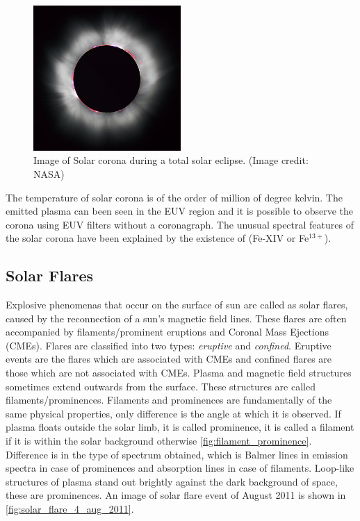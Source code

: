 \begin{figure}[h!]
    \centering
    \includegraphics[width=0.5\textwidth]{images/corona.jpg}
    \caption[Image of Solar corona during a total solar eclipse]{Image of Solar corona during a total solar eclipse. (Image credit: NASA)}
    \label{fig:corona_eclipse}
\end{figure}

The temperature of solar corona is of the order of million of degree kelvin. The emitted plasma can been seen in the EUV region and it is possible to observe the corona using EUV filters without a coronagraph. The unusual spectral features of the solar corona have been explained by the existence of (Fe-XIV or Fe$^{13+}$). \citep{aschwanden2006physics}

\subsection{Solar Flares}

Explosive phenomenas that occur on the surface of sun are called as solar flares, caused by the reconnection of a sun's magnetic field lines. These flares are often accompanied by filaments/prominent eruptions and Coronal Mass Ejections (CMEs). Flares are classified into two types: \textit{eruptive} and \textit{confined}. Eruptive events are the flares which are associated with CMEs and confined flares are those which are not associated with CMEs. Plasma and magnetic field structures sometimes extend outwards from the surface. These structures are called filaments/prominences. Filaments and prominences are fundamentally of the same physical properties, only difference is the angle at which it is observed. If plasma floats outside the solar limb, it is called prominence, it is called a filament if it is within the solar background otherwise \cref{fig:filament_prominence}. Difference is in the type of spectrum obtained, which is Balmer lines in emission spectra in case of prominences and absorption lines in case of filaments. Loop-like structures of plasma stand out brightly against the dark background of space, these are prominences. An image of solar flare event of  August 2011 is shown in \cref{fig:solar_flare_4_aug_2011}.

